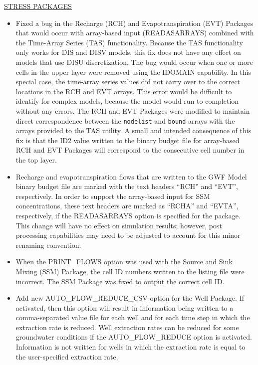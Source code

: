 \documentclass[11pt,twoside,twocolumn]{usgsreport}
\begin{document}
\begin{itemize}
	\underline{STRESS PACKAGES}
	\begin{itemize}
	        \item Fixed a bug in the Recharge (RCH) and Evapotranspiration (EVT) Packages that would occur with array-based input (READASARRAYS) combined with the Time-Array Series (TAS) functionality.  Because the TAS functionality only works for DIS and DISV models, this fix does not have any effect on models that use DISU discretization.  The bug would occur when one or more cells in the upper layer were removed using the IDOMAIN capability.  In this special case, the time-array series values did not carry over to the correct locations in the RCH and EVT arrays.  This error would be difficult to identify for complex models, because the model would run to completion without any errors.  The RCH and EVT Packages were modified to maintain direct correspondence between the \texttt{nodelist} and \texttt{bound} arrays with the arrays provided to the TAS utility.  A small and intended consequence of this fix is that the ID2 value written to the binary budget file for array-based RCH and EVT Packages will correspond to the consecutive cell number in the top layer.  
	        \item Recharge and evapotranspiration flows that are written to the GWF Model binary budget file are marked with the text headers ``RCH'' and ``EVT'', respectively.  In order to support the array-based input for SSM concentrations, these text headers are marked as ``RCHA'' and ``EVTA'', respectively, if the READASARRAYS option is specified for the package.  This change will have no effect on simulation results; however, post processing capabilities may need to be adjusted to account for this minor renaming convention.
	        \item When the PRINT\_FLOWS option was used with the Source and Sink Mixing (SSM) Package, the cell ID numbers written to the listing file were incorrect.  The SSM Package was fixed to output the correct cell ID.
	        \item Add new AUTO\_FLOW\_REDUCE\_CSV option for the Well Package.  If activated, then this option will result in information being written to a comma-separated value file for each well and for each time step in which the extraction rate is reduced.  Well extraction rates can be reduced for some groundwater conditions if the AUTO\_FLOW\_REDUCE option is activated.  Information is not written for wells in which the extraction rate is equal to the user-specified extraction rate.
	\end{itemize}


\end{itemize}
\end{document}
